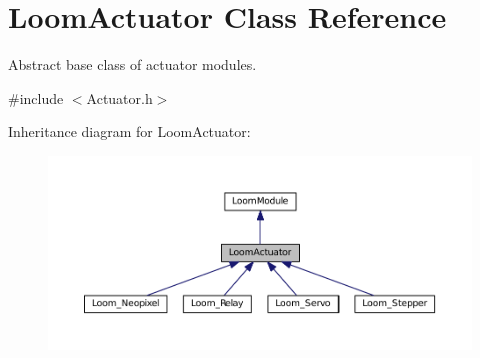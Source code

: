 \hypertarget{class_loom_actuator}{}\section{Loom\+Actuator Class Reference}
\label{class_loom_actuator}


Abstract base class of actuator modules.  




{\ttfamily \#include $<$Actuator.\+h$>$}



Inheritance diagram for Loom\+Actuator\+:\nopagebreak
\begin{figure}[H]
\begin{center}
\leavevmode
\includegraphics[width=350pt]{class_loom_actuator__inherit__graph}
\end{center}
\end{figure}
